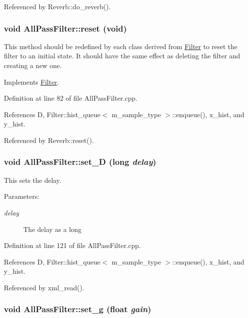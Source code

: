 Referenced by Reverb::do\_\-reverb().\hypertarget{classAllPassFilter_a3}{
\subsubsection[reset]{\setlength{\rightskip}{0pt plus 5cm}void All\-Pass\-Filter::reset (void)}}
\label{classAllPassFilter_a3}


This method should be redefined by each class derived from \hyperlink{classFilter}{Filter} to reset the filter to an initial state. It should have the same effect as deleting the filter and creating a new one. 

Implements \hyperlink{classFilter_a4}{Filter}.

Definition at line 82 of file All\-Pass\-Filter.cpp.

References D, Filter::hist\_\-queue$<$ m\_\-sample\_\-type $>$::enqueue(), x\_\-hist, and y\_\-hist.

Referenced by Reverb::reset().\hypertarget{classAllPassFilter_a7}{
\subsubsection[set\_\-D]{\setlength{\rightskip}{0pt plus 5cm}void All\-Pass\-Filter::set\_\-D (long {\em delay})}}
\label{classAllPassFilter_a7}


This sets the delay. \begin{Desc}
\item[Parameters:]
\begin{description}
\item[{\em delay}]The delay as a long \end{description}
\end{Desc}


Definition at line 121 of file All\-Pass\-Filter.cpp.

References D, Filter::hist\_\-queue$<$ m\_\-sample\_\-type $>$::enqueue(), x\_\-hist, and y\_\-hist.

Referenced by xml\_\-read().\hypertarget{classAllPassFilter_a6}{
\subsubsection[set\_\-g]{\setlength{\rightskip}{0pt plus 5cm}void All\-Pass\-Filter::set\_\-g (float {\em gain})}}
\label{classAllPassFilter_a6}


